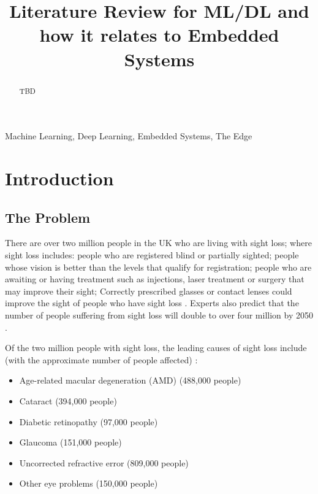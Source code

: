 \documentclass[conference]{IEEEtran}
\begin{document}
\title{Literature Review for ML/DL and how it relates to Embedded Systems\\}

\author{
}

\maketitle

\begin{abstract}
TBD
\end{abstract}

\begin{IEEEkeywords}
Machine Learning, Deep Learning, Embedded Systems, The Edge
\end{IEEEkeywords}

\section{Introduction}
\subsection{The Problem}
There are over two million people in the UK who are living with sight loss; where sight loss includes: people who are registered blind or partially sighted; people whose vision is better than the levels that qualify for registration; people who are awaiting or having treatment such as injections, laser treatment or surgery that may improve their sight; Correctly prescribed glasses or contact lenses could improve the sight of people who have sight loss \cite{rnib}. Experts also predict that the number of people suffering from sight loss will double to over four million by 2050 \cite{Pezzullo}.

Of the two million people with sight loss, the leading causes of sight loss include (with the approximate number of people affected) \cite{rnib}:
\begin{itemize}
    \item Age-related macular degeneration (AMD) (488,000 people)
    \item Cataract (394,000 people)
    \item Diabetic retinopathy (97,000 people)
    \item Glaucoma (151,000 people)
    \item Uncorrected refractive error (809,000 people)
    \item Other eye problems (150,000 people)
\end{itemize}
\end{document}
